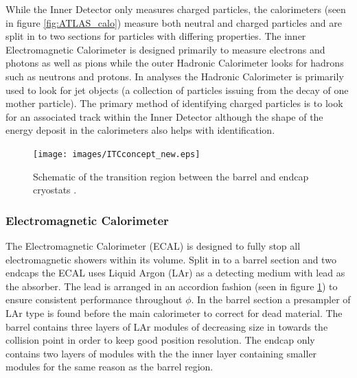 		While the Inner Detector only measures charged particles, the calorimeters (seen in figure \ref{fig:ATLAS_calo}) measure both neutral and charged particles and are split in to two sections for particles with differing properties. The inner Electromagnetic Calorimeter is designed primarily to measure electrons and photons as well as pions while the outer Hadronic Calorimeter looks for hadrons such as neutrons and protons. In analyses the Hadronic Calorimeter is primarily used to look for jet objects (a collection of particles issuing from the decay of one mother particle). The primary method of identifying charged particles is to look for an associated track within the Inner Detector although the shape of the energy deposit in the calorimeters also helps with identification.



		\begin{figure}[h!]
			\begin{center}
				\texttt{[image: images/ITCconcept\_new.eps]}
			\end{center}
			\caption{Schematic of the transition region between the barrel and endcap cryostats \cite{Aad:1129811}.}
			\label{fig:ATLAS_calo_crack}
		\end{figure}


		\subsubsection*{Electromagnetic Calorimeter}

		The Electromagnetic Calorimeter (ECAL) is designed to fully stop all electromagnetic showers within its volume. Split in to a barrel section and two endcaps the ECAL uses Liquid Argon (LAr) as a detecting medium with lead as the absorber. The lead is arranged in an accordion fashion (seen in figure \ref{fig:ATLAS_calo_crack}) to ensure consistent performance throughout $\phi$. In the barrel section a presampler of LAr type is found before the main calorimeter to correct for dead material. The barrel contains three layers of LAr modules of decreasing size in towards the collision point in order to keep good position resolution. The endcap only contains two layers of modules with the the inner layer containing smaller modules for the same reason as the barrel region.



